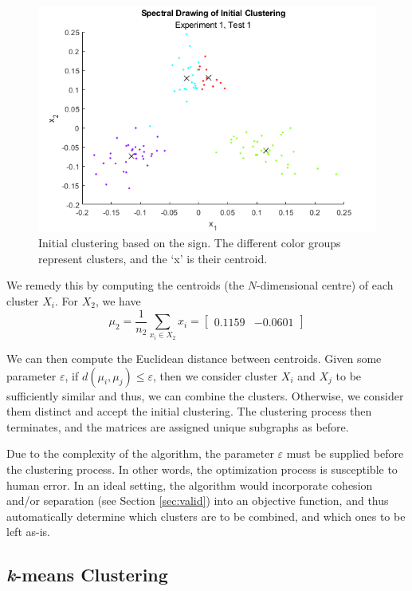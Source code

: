 \documentclass[11pt, letterpaper]{article}
\theoremstyle{perchance}
\begin{document}
        \begin{figure}[h!]
            \centering
            \includegraphics[width=0.75\linewidth]{images/spectral_drawing.png}
            \caption{Initial clustering based on the sign. The different color groups represent clusters, and the `x' is their centroid.}
            \label{fig:spatial}
        \end{figure}
        
        We remedy this by computing the centroids (the $N$-dimensional centre) of each cluster $X_i$. For $X_2$, we have
        \[\mu_2 = \frac{1}{n_2} \sum_{x_i \in X_2}x_i = \begin{bmatrix}
            0.1159 & -0.0601
        \end{bmatrix}\]
        
        We can then compute the Euclidean distance between centroids. Given some parameter $\varepsilon$, if $d(\mu_i, \mu_j) \leq \varepsilon$, then we consider cluster $X_i$ and $X_j$ to be sufficiently similar and thus, we can combine the clusters. Otherwise, we consider them distinct and accept the initial clustering. The clustering process then terminates, and the matrices are assigned unique subgraphs as before.
        
        Due to the complexity of the algorithm, the parameter $\varepsilon$ must be supplied before the clustering process. In other words, the optimization process is susceptible to human error. In an ideal setting, the algorithm would incorporate cohesion and/or separation (see Section \ref{sec:valid}) into an objective function, and thus automatically determine which clusters are to be combined, and which ones to be left as-is.

    \subsection{\textit{k}-means Clustering}
\end{document}
